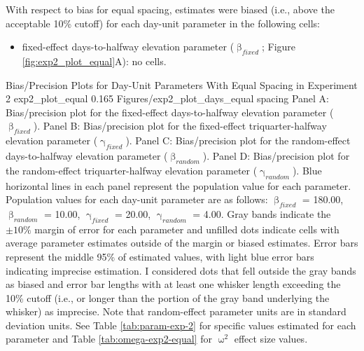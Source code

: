 \documentclass[
12pt, %
twoside,
english]{guelphthesis}
\begin{document}
With respect to bias for equal spacing, estimates were biased (i.e., above the acceptable 10\% cutoff) for each day-unit parameter in the following cells:
\begin{itemize}
\tightlist
\item
  fixed-effect days-to-halfway elevation parameter (\(\upbeta_{fixed}\); Figure \ref{fig:exp2_plot_equal}A): no cells.
\end{itemize}
\begin{apaFigure}
[portrait]
[samepage]
[-0.2cm]
{Bias/Precision Plots for Day-Unit Parameters With Equal Spacing in Experiment 2}
{exp2_plot_equal}
{0.165}
{Figures/exp2_plot_days_equal spacing}
{Panel A: Bias/precision plot for the fixed-effect days-to-halfway elevation parameter ($\upbeta_{fixed}$). Panel B: Bias/precision plot for the fixed-effect triquarter-halfway elevation parameter ($\upgamma_{fixed}$). Panel C: Bias/precision plot for the random-effect days-to-halfway elevation parameter ($\upbeta_{random}$). Panel D: Bias/precision plot for the random-effect triquarter-halfway elevation parameter ($\upgamma_{random}$). Blue horizontal lines in each panel represent the population value for each parameter. Population values for each day-unit parameter are as follows: $\upbeta_{fixed}$ = 180.00, $\upbeta_{random}$ = 10.00, $\upgamma_{fixed}$ = 20.00, $\upgamma_{random}$ = 4.00. Gray bands indicate the $\pm 10\%$ margin of error for each parameter and unfilled dots indicate cells with average parameter estimates outside of the margin or biased estimates. Error bars represent the middle 95\% of estimated values, with light blue error bars indicating imprecise estimation. I considered dots that fell outside the gray bands as biased and error bar lengths with at least one whisker length exceeding the 10\% cutoff (i.e., or longer than the portion of the gray band underlying the whisker) as imprecise. Note that random-effect parameter units are in standard deviation units. See Table \ref{tab:param-exp-2} for specific values estimated for each parameter and Table \ref{tab:omega-exp2-equal} for $\upomega^2$ effect size values.}
\end{apaFigure}
\end{document}

